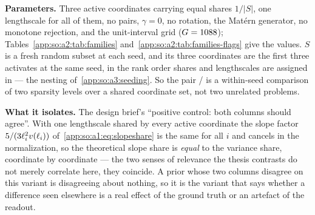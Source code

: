 \begin{table}[htbp]
  \centering
  \caption[The archived grid, variant by variant]{
  What the archived grid measures on each variant: $\knots$, the spread of
  $\fstar$ over the seeds, and the two assembly invariants ---
  $\Varnu f=1$ and $\Enu f=0$ --- checked per objective. Draw-dependent:
  $\fstar$ and both moment columns move with the draw, so the numbers are those
  of this archive and not of a re-run elsewhere. Measured on the archived grid,
  seeds $0$--$9$, $D=\SOnumStudyD$, this machine's BLAS\@. Protocol, from the
  file's own header comment: the $\Varnu$ and $\Enu$ columns are QMC estimates
  of the \emph{true} $\refnu$-moments --- a fresh scrambled Sobol' sample per
  objective --- ``not the $64$-node $\nuhat$ quadrature ($\Varhat$/$\Ehat$)
   uses''. Across the whole grid the worst deviation
  of $\Varnu f$ from one is \SOnumWorstVar{} and the worst $|\Enu f|$ is
  \SOnumWorstMean. The column headers are abbreviated: $\knots$ is the knot
  count, ``$\fstar$ med.\ [min, max]'' the median of $\fstar$ over the ten
  seeds with their range beside it, and the last three columns those QMC
  estimates over the same ten seeds. The final row repeats one rotated
  objective ---  at seed $6$ --- at a
  sixteen-fold larger Sobol' sample, so the residual visible in the
   row above can be read as sampling error rather than a
  defect in the objective.}\label{app:so:a2:tab:grid}
  \footnotesize\setlength{\tabcolsep}{3pt}
  
\end{table}

\label{app:so:a2:aligned3}

\textbf{Parameters.} Three active coordinates carrying equal shares $1/|S|$,
one lengthscale for all of them, no pairs, $\gamma=0$, no rotation, the
Mat\'ern generator, no monotone rejection, and the unit-interval grid
($G=1088$); Tables~\ref{app:so:a2:tab:families}
and~\ref{app:so:a2:tab:families-flags} give the values. $S$ is a fresh random
subset at each seed, and its three coordinates
are the first three  activates at the same seed, in the rank
order shares and lengthscales are assigned in --- the nesting
of~\ref{app:so:a3:seeding}. So the pair / is
a within-seed comparison of two sparsity levels over a shared coordinate set,
not two unrelated problems.

\textbf{What it isolates.} The design brief's ``positive control: both columns
should agree''. With one lengthscale shared by every active coordinate the
slope factor $5/(3\ell_i^2v(\ell_i))$
of~\eqref{app:so:a1:eq:slopeshare} is the same for all $i$ and cancels in the
normalization, so the theoretical slope share is \emph{equal} to the variance
share, coordinate by coordinate --- the two senses of relevance the thesis
contrasts do not merely correlate here, they coincide. A prior whose two
columns disagree on this variant is disagreeing about nothing, so it is the
variant that says whether a difference seen elsewhere is a real effect of the
ground truth or an artefact of the readout.

